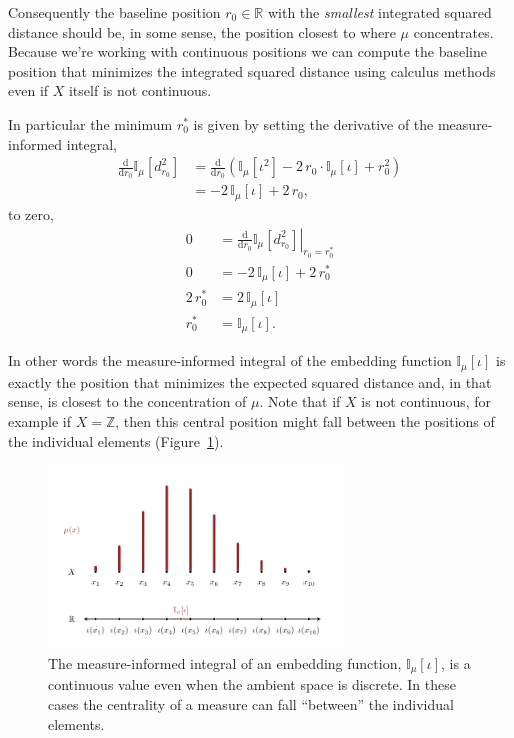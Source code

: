\documentclass[
  letterpaper,
  DIV=11,
  numbers=noendperiod]{scrartcl}
\begin{document}
Consequently the baseline position \(r_{0} \in \mathbb{R}\) with the
\emph{smallest} integrated squared distance should be, in some sense,
the position closest to where \(\mu\) concentrates. Because we're
working with continuous positions we can compute the baseline position
that minimizes the integrated squared distance using calculus methods
even if \(X\) itself is not continuous.

In particular the minimum \(r_{0}^{*}\) is given by setting the
derivative of the measure-informed integral, \begin{align*}
\frac{\mathrm{d}}{\mathrm{d} r_{0} }
\mathbb{I}_{\mu} \left[ d_{r_{0}}^{2} \right]
&=
\frac{\mathrm{d}}{\mathrm{d} r_{0} }
\left( \mathbb{I}_{\mu} \left[ \iota^{2} \right]
-2 \, r_{0} \cdot \mathbb{I}_{\mu} \left[ \iota \right]
+ r_{0}^{2} \right)
\\
&=
-2 \, \mathbb{I}_{\mu} \left[ \iota \right]
+ 2 \, r_{0},
\end{align*} to zero, \begin{align*}
0
&= \left. \frac{\mathrm{d}}{\mathrm{d} r_{0} }
\mathbb{I}_{\mu} \left[ d_{r_{0}}^{2} \right] \right|_{r_{0} = r_{0}^{*}}
\\
0
&=
-2 \, \mathbb{I}_{\mu} \left[ \iota \right]
+ 2 \, r_{0}^{*}
\\
2 \, r_{0}^{*}
&=
2 \, \mathbb{I}_{\mu} \left[ \iota \right]
\\
r_{0}^{*}
&=
\mathbb{I}_{\mu} \left[ \iota \right].
\end{align*}

In other words the measure-informed integral of the embedding function
\(\mathbb{I}_{\mu} [ \iota ]\) is exactly the position that minimizes
the expected squared distance and, in that sense, is closest to the
concentration of \(\mu\). Note that if \(X\) is not continuous, for
example if \(X = \mathbb{Z}\), then this central position might fall
between the positions of the individual elements
(Figure~\ref{fig-mean}).

\begin{figure}

{\centering \includegraphics[width=0.7\textwidth,height=\textheight]{figures/mean/mean.pdf}

}

\caption{\label{fig-mean}The measure-informed integral of an embedding
function, \(\mathbb{I}_{\mu} [ \iota ]\), is a continuous value even
when the ambient space is discrete. In these cases the centrality of a
measure can fall ``between'' the individual elements.}

\end{figure}
\end{document}
